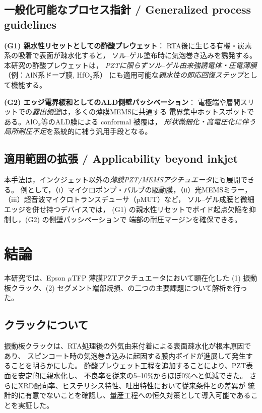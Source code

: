 \documentclass[conference]{IEEEtran}
\begin{document}
\subsection*{一般化可能なプロセス指針 / Generalized process guidelines}

\textbf{(G1) 親水性リセットとしての酢酸プレウェット}：
RTA後に生じる有機・炭素系の吸着で表面が疎水化すると，
ソル–ゲル塗布時に気泡巻き込みを誘発する。本研究の酢酸プレウェットは，
\emph{PZTに限らずソル–ゲル由来強誘電体・圧電薄膜}（例：AlN系ドープ膜, HfO$_2$系）
にも適用可能な\emph{親水性の即応回復ステップ}として機能する。

\textbf{(G2) エッジ電界緩和としてのALD側壁パッシベーション}：
電極端や層間スリットでの\emph{露出側壁}は，多くの薄膜MEMSに共通する
電界集中ホットスポットである。AlO$_x$等のALD膜による conformal 被覆は，
\emph{形状微細化・高電圧化に伴う局所耐圧不足}を系統的に補う汎用手段となる。

\subsection*{適用範囲の拡張 / Applicability beyond inkjet}
本手法は，インクジェット以外の\emph{薄膜PZT/MEMSアクチュエータ}にも展開できる。
例として，（i）マイクロポンプ・バルブの駆動膜，（ii）光MEMSミラー，
（iii）超音波マイクロトランスデューサ（pMUT）など，
ソル–ゲル成膜と微細エッジを併せ持つデバイスでは，
(G1) の親水性リセットでボイド起点欠陥を抑制し，(G2) の側壁パッシベーションで
端部の耐圧マージンを確保できる。

\section{結論}
本研究では、Epson $\mu$TFP 薄膜PZTアクチュエータにおいて顕在化した
(1) 振動板クラック、(2) セグメント端部焼損、の二つの主要課題について解析を行った。

\subsection{クラックについて}
振動板クラックは、RTA処理後の外気由来付着による表面疎水化が根本原因であり、
スピンコート時の気泡巻き込みに起因する膜内ボイドが進展して発生することを明らかにした。
酢酸プレウェット工程を追加することにより、PZT表面を安定的に親水化し、
不良率を従来の5--10\%からほぼ0\%へと低減できた。
さらにXRD配向率、ヒステリシス特性、吐出特性において従来条件との差異が
統計的に有意でないことを確認し、量産工程への恒久対策として導入可能であることを実証した。
\end{document}
